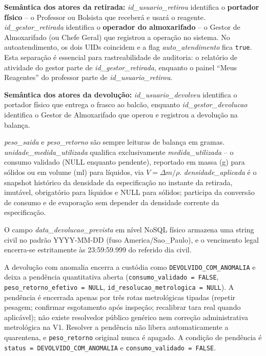 \begin{explicacao}
\textbf{Semântica dos atores da retirada:} \textit{id\_usuario\_retirou} identifica o \textbf{portador físico} -- o Professor ou Bolsista que receberá e usará o reagente. \textit{id\_gestor\_retirada} identifica o \textbf{operador do almoxarifado} -- o Gestor de Almoxarifado (ou Chefe Geral) que registrou a operação no sistema. No autoatendimento, os dois UIDs coincidem e a flag \textit{auto\_atendimento} fica \texttt{true}. Esta separação é essencial para rastreabilidade de auditoria: o relatório de atividade do gestor parte de \textit{id\_gestor\_retirada}, enquanto o painel ``Meus Reagentes'' do professor parte de \textit{id\_usuario\_retirou}.

\textbf{Semântica dos atores da devolução:} \textit{id\_usuario\_devolveu} identifica o portador físico que entrega o frasco ao balcão, enquanto \textit{id\_gestor\_devolucao} identifica o Gestor de Almoxarifado que operou e registrou a devolução na balança.

\textit{peso\_saida} e \textit{peso\_retorno} são sempre leituras de balança em gramas. \textit{unidade\_medida\_utilizada} qualifica exclusivamente \textit{medida\_utilizada} -- o consumo validado (NULL enquanto pendente), reportado em massa (g) para sólidos ou em volume (ml) para líquidos, via $V = \Delta m / \rho$. \textit{densidade\_aplicada} é o snapshot histórico da densidade da especificação no instante da retirada, imutável, obrigatório para líquidos e NULL para sólidos; participa da conversão de consumo e de evaporação sem depender da densidade corrente da especificação.

O campo \textit{data\_devolucao\_prevista} em nível NoSQL físico armazena uma string civil no padrão YYYY-MM-DD (fuso America/Sao\_Paulo), e o vencimento legal encerra-se estritamente às 23:59:59.999 do referido dia civil.

A devolução com anomalia encerra a custódia como \texttt{DEVOLVIDO\_COM\_ANOMALIA} e deixa a pendência quantitativa aberta (\texttt{consumo\_validado = FALSE}, \texttt{peso\_retorno\_efetivo = NULL}, \texttt{id\_resolucao\_metrologica = NULL}). A pendência é encerrada apenas por três rotas metrológicas tipadas (repetir pesagem; confirmar esgotamento após inspeção; recalibrar tara real quando aplicável); não existe resolvedor público genérico nem correção administrativa metrológica na V1. Resolver a pendência não libera automaticamente a quarentena, e \texttt{peso\_retorno} original nunca é apagado. A condição de pendência é \texttt{status = DEVOLVIDO\_COM\_ANOMALIA} e \texttt{consumo\_validado = FALSE}.


\end{explicacao}
